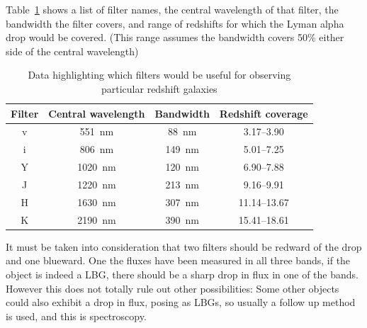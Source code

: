 			Table~\ref{tab:filter_characteristics} shows a list of filter names, the central wavelength of that filter, the bandwidth the filter covers, and range of redshifts for which the Lyman alpha drop would be covered. (This  range assumes the bandwidth covers 50\% either side of the central wavelength)
			\begin{table}[htbp]
				\begin{center}
					\begin{tabular}{c|c|c|c}
						Filter 	& Central wavelength & Bandwidth & Redshift coverage \\
						\hline \hline
						v 	& \SI{551}{\nano\metre}	 & \SI{88}{\nano\metre} & 3.17--3.90 \\
						i 	& \SI{806}{\nano\metre}	 & \SI{149}{\nano\metre} & 5.01--7.25 \\
						Y 	& \SI{1020}{\nano\metre} & \SI{120}{\nano\metre} & 6.90--7.88 \\
						J 	& \SI{1220}{\nano\metre} & \SI{213}{\nano\metre} & 9.16--9.91 \\
						H 	& \SI{1630}{\nano\metre} & \SI{307}{\nano\metre} & 11.14--13.67 \\
						K 	& \SI{2190}{\nano\metre} & \SI{390}{\nano\metre} & 15.41--18.61
					\end{tabular}
				\end{center}
				\caption{Data highlighting which filters would be useful for observing particular redshift galaxies\cite{Galactic_Astronomy_Binney_Merrifield}}
				\label{tab:filter_characteristics}
			\end{table}

			It must be taken into consideration that two filters should be redward of the drop and one blueward. One the fluxes have been measured in all three bands, if the object is indeed a LBG, there should be a sharp drop in flux in  one of the bands. However this does not totally rule out other possibilities: Some other objects could also exhibit a drop in flux, posing as LBGs, so usually a follow up method is used, and this is spectroscopy. 

